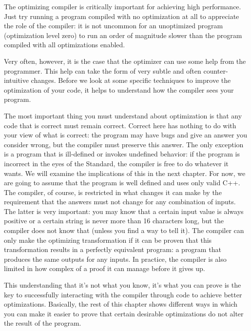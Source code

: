 
The optimizing compiler is critically important for achieving high performance. Just try running a program compiled with no optimization at all to appreciate the role of the compiler: it is not uncommon for an unoptimized program (optimization level zero) to run an order of magnitude slower than the program compiled with all optimizations enabled.

Very often, however, it is the case that the optimizer can use some help from the programmer. This help can take the form of very subtle and often counter-intuitive changes. Before we look at some specific techniques to improve the optimization of your code, it helps to understand how the compiler sees your program.


The most important thing you must understand about optimization is that any code that is correct must remain correct. Correct here has nothing to do with your view of what is correct: the program may have bugs and give an answer you consider wrong, but the compiler must preserve this answer. The only exception is a program that is ill-defined or invokes undefined behavior: if the program is incorrect in the eyes of the Standard, the compiler is free to do whatever it wants. We will examine the implications of this in the next chapter. For now, we are going to assume that the program is well defined and uses only valid C++. The compiler, of course, is restricted in what changes it can make by the requirement that the answers must not change for any combination of inputs. The latter is very important: you may know that a certain input value is always positive or a certain string is never more than 16 characters long, but the compiler does not know that (unless you find a way to tell it). The compiler can only make the optimizing transformation if it can be proven that this transformation results in a perfectly equivalent program: a program that produces the same outputs for any inputs. In practice, the compiler is also limited in how complex of a proof it can manage before it gives up.

This understanding that it's not what you know, it's what you can prove is the key to successfully interacting with the compiler through code to achieve better optimizations. Basically, the rest of this chapter shows different ways in which you can make it easier to prove that certain desirable optimizations do not alter the result of the program.

